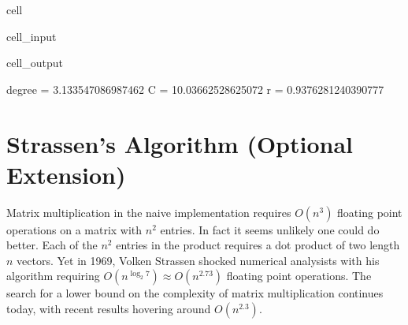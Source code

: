 \documentclass[letterpaper,10pt,english]{jupyterBook}
\begin{document}
\begin{sphinxuseclass}{cell}\begin{sphinxVerbatimInput}

\begin{sphinxuseclass}{cell_input}
\begin{sphinxVerbatim}[commandchars=\\\{\}]
  
 
\PYG{p}{[}\PYG{p}{]}
\end{sphinxVerbatim}

\end{sphinxuseclass}\end{sphinxVerbatimInput}
\begin{sphinxVerbatimOutput}

\begin{sphinxuseclass}{cell_output}
\begin{sphinxVerbatim}[commandchars=\\\{\}]
degree =  3.133547086987462
C =  10.03662528625072
r = 0.9376281240390777
\end{sphinxVerbatim}

\end{sphinxuseclass}\end{sphinxVerbatimOutput}

\end{sphinxuseclass}
\sphinxstepscope


\chapter{Strassen’s Algorithm (Optional Extension)}
\label{\detokenize{lessons/Strassen-Lab:strassen-s-algorithm-optional-extension}}\label{\detokenize{lessons/Strassen-Lab::doc}}
\sphinxAtStartPar
Matrix multiplication in the naive implementation requires \(O(n^3)\) floating point
operations on a matrix with \(n^2\) entries. In fact it seems unlikely one could do better.
Each of the \(n^2\) entries in the product requires a dot product of two length \(n\) vectors.
Yet in 1969, Volken Strassen shocked numerical analysists with his algorithm requiring
\(O(n^{\log_2{7}}) \approx O(n^{2.73})\) floating point operations. The search for a lower bound
on the complexity of matrix multiplication continues today, with recent results hovering around \(O(n^{2.3})\).
\end{document}
